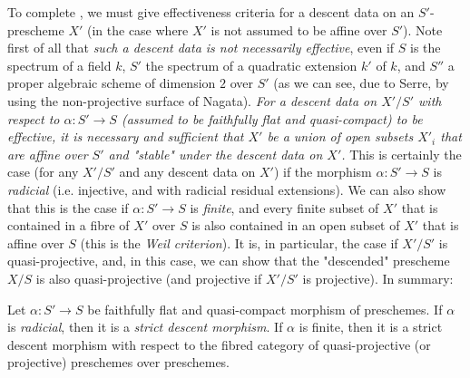 To complete , we must give effectiveness criteria for a descent data on an $S'$-prescheme $X'$ (in the case where $X'$ is not assumed to be affine over $S'$).
Note first of all that \emph{such a descent data is not necessarily effective}, even if $S$ is the spectrum of a field $k$, $S'$ the spectrum of a quadratic extension $k'$ of $k$, and $S''$ a proper algebraic scheme of dimension $2$ over $S'$ (as we can see, due to Serre, by using the non-projective surface of Nagata).
\emph{For a descent data on $X'/S'$ with respect to $\alpha\colon S'\to S$ (assumed to be faithfully flat and quasi-compact) to be effective, it is necessary and sufficient that $X'$ be a union of open subsets $X'_i$ that are affine over $S'$ and "stable" under the descent data on $X'$.}
This is certainly the case (for any $X'/S'$ and any descent data on $X'$) if the morphism $\alpha\colon S'\to S$ is \emph{radicial} (i.e. injective, and with radicial residual extensions).
We can also show that this is the case if $\alpha\colon S'\to S$ is \emph{finite}, and every finite subset of $X'$ that is contained in a fibre of $X'$ over $S$ is also contained in an open subset of $X'$ that is affine over $S$ (this is the \emph{Weil criterion}).
It is, in particular, the case if $X'/S'$ is quasi-projective, and, in this case, we can show that the "descended" prescheme $X/S$ is also quasi-projective (and projective if $X'/S'$ is projective).
In summary:


\begin{theorem}\label{fga3.i-b.1-theorem-3}
    Let $\alpha\colon S'\to S$ be faithfully flat and quasi-compact morphism of preschemes.
    If $\alpha$ is \emph{radicial}, then it is a \emph{strict descent morphism}.
    If $\alpha$ is finite, then it is a strict descent morphism with respect to the fibred category of quasi-projective (or projective) preschemes over preschemes.
\end{theorem}

